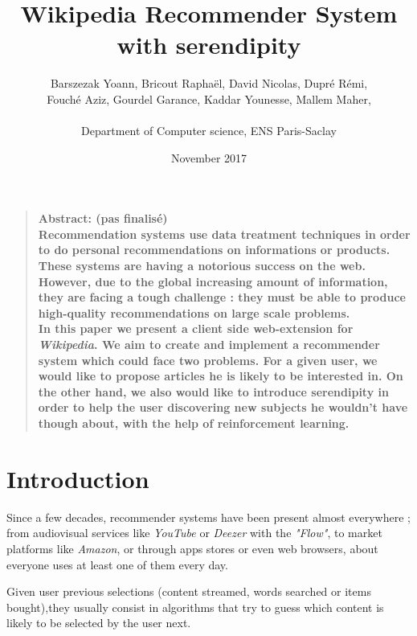 \documentclass[11pt]{article}
\title{Wikipedia Recommender System with serendipity}
\author
    {
      Barszezak Yoann, Bricout Rapha\"el, David Nicolas, Dupr\'e R\'emi,\\
      Fouch\'e Aziz, Gourdel Garance, Kaddar Younesse, Mallem Maher,\\
      \\
      \normalsize{Department of Computer science, ENS Paris-Saclay}\\
    }
\date{November 2017}
\theoremstyle{plain}
\theoremstyle{definition}
\theoremstyle{remark}
\newenvironment{sciabstract}{
\begin{quote} \bf}
{\end{quote}}
\begin{document}
 


\baselineskip10pt


\maketitle 




\begin{sciabstract}
Abstract: (pas finalisé)\\

Recommendation systems use data treatment techniques in order to do personal recommendations on informations or products. These systems are having a notorious success on the web. However, due to the global increasing amount of information, they are facing a tough challenge : they must be able to produce high-quality recommendations on large scale problems. \\
In this paper we present a client side web-extension for \textit{Wikipedia}. We aim to create and implement a recommender system which could face two problems. For a given user, we would like to propose articles he is likely to be interested in. On the other hand, we also would like to introduce serendipity in order to help the user discovering new subjects he wouldn't have though about, with the help of reinforcement learning.
\end{sciabstract}


\tableofcontents


\section*{Introduction}

Since a few decades, recommender systems have been present almost everywhere ; from audiovisual services like \textit{YouTube} or \textit{Deezer} with the \textit{"Flow"}, to market platforms like \textit{Amazon}, or through apps stores or even web browsers, about everyone uses at least one of them every day. 

Given user previous selections (content streamed, words searched or items bought),they usually consist in algorithms that try to guess which content is likely to be selected by the user next. \\
\end{document}
